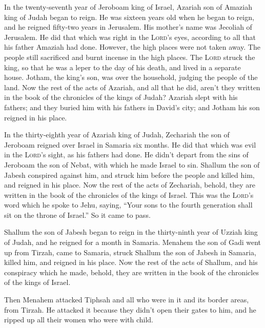  In the twenty-seventh year of Jeroboam king of Israel,
Azariah son of Amaziah king of Judah began to reign.  He
was sixteen years old when he began to reign, and he reigned fifty-two
years in Jerusalem. His mother's name was Jecoliah of Jerusalem.
 He did that which was right in the \textsc{Lord}'s eyes,
according to all that his father Amaziah had done. 
However, the high places were not taken away. The people still
sacrificed and burnt incense in the high places.  The
\textsc{Lord} struck the king, so that he was a leper to the day of his
death, and lived in a separate house. Jotham, the king's son, was over
the household, judging the people of the land.  Now the
rest of the acts of Azariah, and all that he did, aren't they written in
the book of the chronicles of the kings of Judah?  Azariah
slept with his fathers; and they buried him with his fathers in David's
city; and Jotham his son reigned in his place.

 In the thirty-eighth year of Azariah king of Judah,
Zechariah the son of Jeroboam reigned over Israel in Samaria six months.
 He did that which was evil in the \textsc{Lord}'s sight,
as his fathers had done. He didn't depart from the sins of Jeroboam the
son of Nebat, with which he made Israel to sin.  Shallum
the son of Jabesh conspired against him, and struck him before the
people and killed him, and reigned in his place.  Now the
rest of the acts of Zechariah, behold, they are written in the book of
the chronicles of the kings of Israel.  This was the
\textsc{Lord}'s word which he spoke to Jehu, saying, ``Your sons to the
fourth generation shall sit on the throne of Israel.'' So it came to
pass.

 Shallum the son of Jabesh began to reign in the
thirty-ninth year of Uzziah king of Judah, and he reigned for a month in
Samaria.  Menahem the son of Gadi went up from Tirzah,
came to Samaria, struck Shallum the son of Jabesh in Samaria, killed
him, and reigned in his place.  Now the rest of the acts
of Shallum, and his conspiracy which he made, behold, they are written
in the book of the chronicles of the kings of Israel.

 Then Menahem attacked Tiphsah and all who were in it and
its border areas, from Tirzah. He attacked it because they didn't open
their gates to him, and he ripped up all their women who were with
child.

